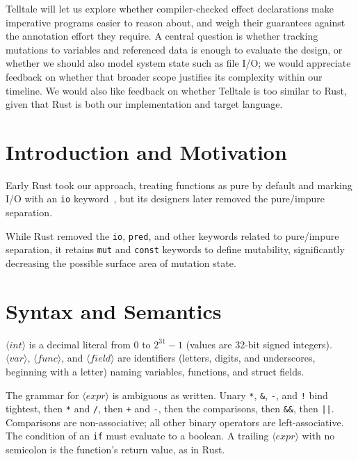 \documentclass[12pt, letterpaper]{article}
\newcommand{\nt}[1]{\ensuremath{\langle\textit{#1}\rangle}}
\begin{document}
Telltale will let us explore whether compiler-checked effect declarations make imperative programs easier to reason about, and weigh their guarantees against the annotation effort they require.
A central question is whether tracking mutations to variables and referenced data is enough to evaluate the design, or whether we should also model system state such as file I/O; we would appreciate feedback on whether that broader scope justifies its complexity within our timeline.
We would also like feedback on whether Telltale is too similar to Rust, given that Rust is both our implementation and target language.





\appendix

\section{Introduction and Motivation}
\label{app:intro}

Early Rust took our approach, treating functions as pure by default and marking I/O with an \texttt{io} keyword~\cite{hoare2013pure}, but its designers later removed the pure/impure separation.

While Rust removed the \texttt{io}, \texttt{pred}, and other keywords related to pure/\allowbreak impure separation, it retains \texttt{mut} and \texttt{const} keywords to define mutability, significantly decreasing the possible surface area of mutation state.

\section{Syntax and Semantics}
\label{app:syntax}
\label{app:structs}

\nt{int} is a decimal literal from $0$ to $2^{31}-1$ (values are 32-bit signed integers).
\nt{var}, \nt{func}, and \nt{field} are identifiers (letters, digits, and underscores, beginning with a letter) naming variables, functions, and struct fields.

The grammar for \nt{expr} is ambiguous as written. Unary \texttt{*}, \texttt{\&}, \texttt{-}, and \texttt{!} bind tightest, then \texttt{*} and \texttt{/}, then \texttt{+} and \texttt{-}, then the comparisons, then \texttt{\&\&}, then \texttt{||}.
Comparisons are non-associative; all other binary operators are left-associative.
The condition of an \texttt{if} must evaluate to a boolean.
A trailing \nt{expr} with no semicolon is the function's return value, as in Rust.
\end{document}

